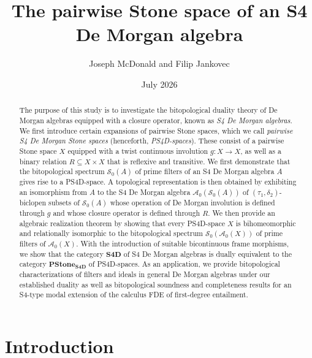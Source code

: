 \documentclass{amsart}
\theoremstyle{plain}
\theoremstyle{definition}
\begin{document}
\title[The pairwise Stone space of an S4 De Morgan algebra]{The pairwise Stone space of an S4 De Morgan algebra}
\author{Joseph McDonald and Filip Jankovec}
\address{Institute of Computer Science, Czech Academy of Sciences}


\date{July 2026}
\maketitle

\begin{abstract}
    The purpose of this study is to investigate the bitopological duality theory of De Morgan algebras equipped with a closure operator, known as \emph{S4 De Morgan algebras}. We first introduce certain expansions of pairwise Stone spaces, which we call \emph{pairwise S4 De Morgan Stone spaces} (henceforth, \emph{PS4D-spaces}). These consist of a pairwise Stone space $X$ equipped with  a twist continuous involution $g\colon X\to X$, as well as a binary relation $R\subseteq X\times X$ that is reflexive and transitive. We first demonstrate that the bitopological spectrum $\mathcal{S}_0(A)$ of prime filters of an S4 De Morgan algebra $A$ gives rise to a PS4D-space. A topological representation is then obtained by exhibiting an isomorphism from $A$ to the S4 De Morgan algebra $\mathcal{A}_0(\mathcal{S}_0(A))$ of $(\tau_1,\delta_2)$-biclopen subsets of $\mathcal{S}_0(A)$ whose operation of De Morgan involution is defined through $g$ and whose closure operator is defined through $R$. We then provide an algebraic realization theorem by showing that every PS4D-space $X$ is bihomeomorphic and relationally isomorphic to the bitopological spectrum $\mathcal{S}_0(\mathcal{A}_0(X))$ of prime filters of $\mathcal{A}_0(X)$. With the introduction of suitable bicontinuous frame morphisms, we show that the category $\mathbf{S4D}$ of S4 De Morgan algebras is dually equivalent to the category $\mathbf{PStone_{S4D}}$ of PS4D-spaces. As an application, we provide bitopological characterizations of filters and ideals in general De Morgan algebras under our established duality as well as bitopological soundness and completeness results for an S4-type modal extension of the calculus FDE of first-degree entailment.
\end{abstract}





\section{Introduction}
\end{document}

